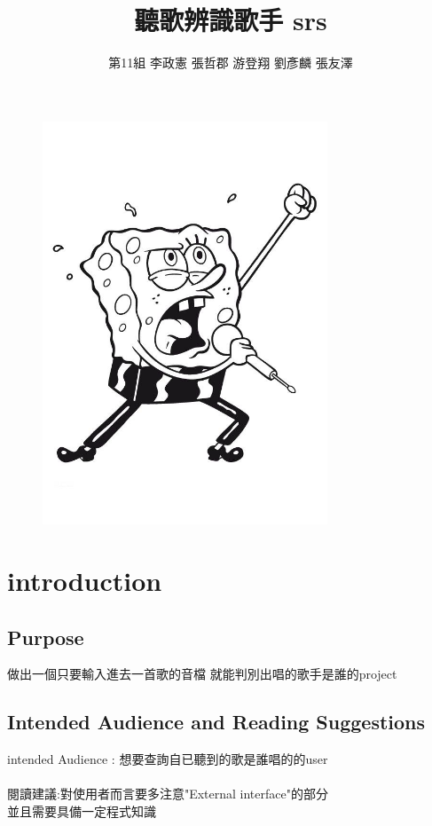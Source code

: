 \documentclass{article}
\begin{document}
\begin{CJK}{UTF8}{bkai}
\title{\Huge \color{blue} 聽歌辨識歌手  srs }
\author{第11組   李政憲 張哲郡 游登翔 劉彥麟 張友澤}
\maketitle
\begin{figure}[h]
\begin{center}
\includegraphics[width=8.5cm]{sing.jpg}
\end{center}
\label{fig:1}
\end{figure}
\newpage
\section{\huge \bf \color{blue}  introduction\\}

\subsection{\Large Purpose\\}
\large 做出一個只要輸入進去一首歌的音檔 就能判別出唱的歌手是誰的project
\subsection{\Large Intended Audience and Reading Suggestions\\}
\large intended Audience : 想要查詢自已聽到的歌是誰唱的的user \\\\
閱讀建議:對使用者而言要多注意"External interface"的部分\\
並且需要具備一定程式知識

\end{CJK}
\end{document}
